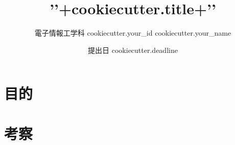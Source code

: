 \documentclass[dvipdfmx, titlepage, a4j]{jsarticle}
\title{{'{'+cookiecutter.title+'}'}}
\author{電子情報工学科 {{ cookiecutter.your_id}} {{ cookiecutter.your_name }}}
\date{提出日 {{ cookiecutter.deadline }}}
\begin{document}
\maketitle
\section{目的}



\section{考察}
\end{document}

